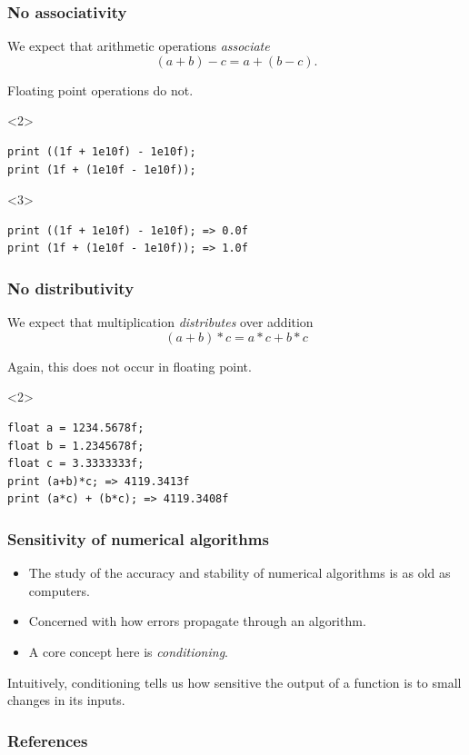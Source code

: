 \documentclass[presentation]{beamer}
\begin{document}
\begin{frame}[fragile]
  \frametitle{No associativity}
  We expect that arithmetic operations \emph{associate}
  \begin{equation*}
    (a + b) - c = a + (b - c).
  \end{equation*}

  Floating point operations do not.

    \begin{center}
      \begin{onlyenv}<2>
\begin{verbatim}
print ((1f + 1e10f) - 1e10f);
print (1f + (1e10f - 1e10f));
\end{verbatim}
      \end{onlyenv}
    \end{center}
    \begin{center}
      \begin{onlyenv}<3>
\begin{verbatim}
print ((1f + 1e10f) - 1e10f); => 0.0f
print (1f + (1e10f - 1e10f)); => 1.0f
\end{verbatim}
      \end{onlyenv}
    \end{center}
\end{frame}

\begin{frame}[fragile]
  \frametitle{No distributivity}
  We expect that multiplication \emph{distributes} over addition
  \begin{equation*}
    (a + b)*c = a*c + b*c
  \end{equation*}

  Again, this does not occur in floating point.

  \begin{center}
    \begin{uncoverenv}<2>
\begin{verbatim}
float a = 1234.5678f;
float b = 1.2345678f;
float c = 3.3333333f;
print (a+b)*c; => 4119.3413f
print (a*c) + (b*c); => 4119.3408f
\end{verbatim}
    \end{uncoverenv}
  \end{center}
\end{frame}

\begin{frame}
  \frametitle{Sensitivity of numerical algorithms}
  \begin{itemize}
  \item The study of the accuracy and stability of numerical algorithms is as old
    as computers.
  \item Concerned with how errors propagate through an algorithm.
  \item A core concept here is \emph{conditioning}.
  \end{itemize}

  Intuitively, conditioning tells us how sensitive the output of a
  function is to small changes in its inputs.
\end{frame}

\appendix
\begin{frame}[allowframebreaks]
  \frametitle{References}
  \printbibliography[heading=none]
\end{frame}
\end{document}
